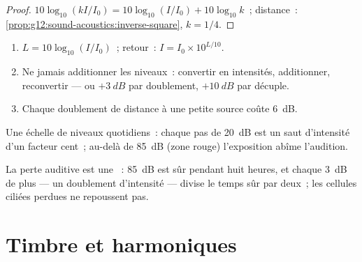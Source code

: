 \begin{proof}
$10\log_{10}(kI/I_0) = 10\log_{10}(I/I_0) + 10\log_{10}k$~;
distance~: \cref{prop:g12:sound-acoustics:inverse-square}, $k = 1/4$.
\end{proof}

\begin{method}\label{met:g12:sound-acoustics:db}
\begin{enumerate}
  \item $L = 10\log_{10}(I/I_0)$~; retour~: $I = I_0 \times 10^{L/10}$.
  \item Ne jamais additionner les niveaux~: convertir en intensités,
        additionner, reconvertir --- ou $+\qty{3}{dB}$ par doublement,
        $+\qty{10}{dB}$ par décuple.
  \item Chaque doublement de distance à une petite source coûte
        \qty{6}{dB}.
\end{enumerate}
\end{method}

\begin{omfigure}

{\small Une échelle de niveaux quotidiens~: chaque pas de \qty{20}{dB}
est un saut d'intensité d'un facteur cent~; au-delà de \qty{85}{dB}
(zone rouge) l'exposition abîme l'audition.}
\end{omfigure}

\begin{remark}\label{rem:g12:sound-acoustics:damage}
La perte auditive est une ~: \qty{85}{dB} est sûr pendant
huit heures, et chaque \qty{3}{dB} de plus --- un doublement
d'intensité --- divise le temps sûr par deux~; les cellules ciliées
perdues ne repoussent pas.
\end{remark}

\section{Timbre et harmoniques}

